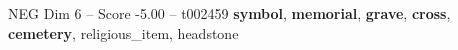 \begin{textsample}{NEG Dim 6 – Score -5.00 – t002459}  \label{ex:f6_neg_039}
\textbf{symbol}, \textbf{memorial}, \textbf{grave}, \textbf{cross}, \textbf{cemetery}, religious\_item, headstone

\end{textsample}
